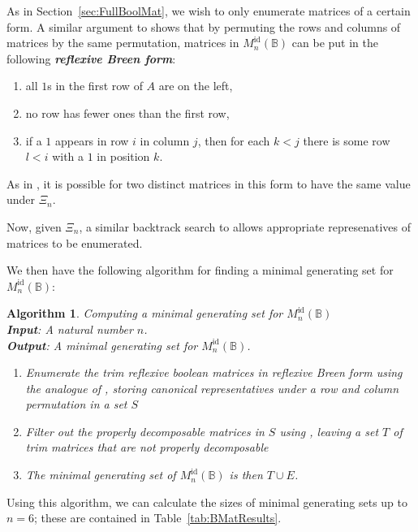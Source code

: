 \documentclass[11pt]{article}
\newtheorem{algo}[thm]{Algorithm}
\newenvironment{alg}{\begin{algo}\rm}{\end{algo}}
\newcommand{\defn}[1]{\textbf{\textit{#1}}}
\numberwithin{equation}{section}
\newcommand{\B}{\mathbb{B}}
\newcommand{\Refn}{M_n^{\text{id}}(\B)}
\begin{document}
As in Section~\ref{sec:FullBoolMat}, we wish to only enumerate matrices of a
certain form. A similar argument to \cite[Proposition 3.6]{Breen1997aa} shows
that by permuting the rows and columns of matrices by the same permutation,
matrices in $\Refn$ can be put in the following \defn{reflexive Breen form}:

\begin{enumerate}[label={\rm (\roman*)}]
  \item{all $1$s in the first row of $A$ are on the left,}
  \item{no row has fewer ones than the first row,}
  \item{if a $1$ appears in row $i$ in column $j$, then for each $k < j$ there
      is some row $l < i$ with a $1$ in position $k$.}
\end{enumerate}

As in , it is possible for two distinct matrices
in this form to have the same value under $\Xi_n$.

Now, given $\Xi_n$, a similar backtrack search to 
allows appropriate represenatives of matrices to be enumerated.

We then have the following algorithm for finding a minimal generating set for
$\Refn$:
\begin{alg}
  Computing a minimal generating set for $\Refn$ \\
  \textbf{Input}: A natural number $n$.\\
  \textbf{Output}: A minimal generating set for $\Refn$.
\begin{enumerate}
  \item
    Enumerate the trim reflexive boolean matrices in reflexive Breen form using
    the analogue of , storing canonical
    representatives under a row and column permutation in a set $S$
  \item 
    Filter out the properly decomposable matrices in $S$ using
    , leaving a set $T$ of trim matrices that
    are not properly decomposable
  \item
    The minimal generating set of $\Refn$ is then $T \cup E$.
\end{enumerate}
\end{alg}
Using this algorithm, we can calculate the sizes of minimal generating sets up
to $n = 6$; these are contained in Table~\ref{tab:BMatResults}.
\end{document}
